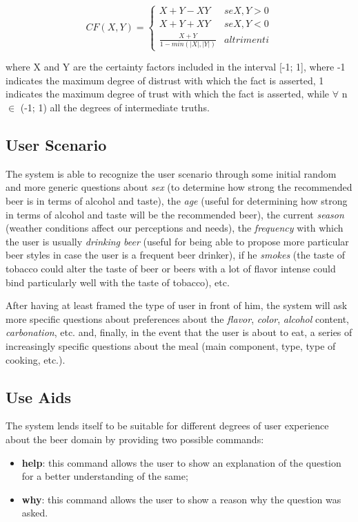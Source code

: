 \documentclass[12pt]{article}
\begin{document}
\[
   CF(X,Y) =
   \begin{cases}
      X+Y-XY & se X,Y > 0 \\
      X+Y+XY & se X,Y < 0 \\
      \frac{X+Y}{1-min(|X|,|Y|)} & altrimenti
   \end{cases}
\]

where X and Y are the certainty factors included in the interval [-1; 1], where -1 indicates the maximum degree of distrust with which the fact is asserted, 1 indicates the maximum degree of trust with which the fact is asserted, while $\forall$ n $\in$ (-1; 1) all the degrees of intermediate truths.

\subsection{User Scenario}
The system is able to recognize the user scenario through some initial random and more generic questions about \textit{sex} (to determine how strong the recommended beer is in terms of alcohol and taste), the \textit{age} (useful for determining how strong in terms of alcohol and taste will be the recommended beer), the current \textit{season} (weather conditions affect our perceptions and needs), the \textit{frequency} with which the user is usually \textit{drinking beer} (useful for being able to propose more particular beer styles in case the user is a frequent beer drinker), if he \textit{smokes} (the taste of tobacco could alter the taste of beer or beers with a lot of flavor intense could bind particularly well with the taste of tobacco), etc.

After having at least framed the type of user in front of him, the system will ask more specific questions about preferences about the \textit{flavor}, \textit{color}, \textit{alcohol} content, \textit{carbonation}, etc. and, finally, in the event that the user is about to eat, a series of increasingly specific questions about the meal (main component, type, type of cooking, etc.).

\subsection{Use Aids}
The system lends itself to be suitable for different degrees of user experience about the beer domain by providing two possible commands:
\begin{itemize}
\item \textbf{help}: this command allows the user to show an explanation of the question for a better understanding of the same;
\item \textbf{why}: this command allows the user to show a reason why the question was asked.
\end{itemize}
\end{document}
